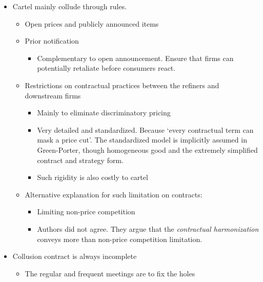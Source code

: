 \documentclass{book}
\theoremstyle{plain}
\theoremstyle{definition}
\begin{document}
\begin{itemize}
	\item Cartel mainly collude through rules.
	\begin{itemize}
		\item Open prices and publicly announced items
		\item Prior notification
		\begin{itemize}
			\item Complementary to open announcement. Ensure that firms can potentially retaliate before consumers react.
		\end{itemize}
		\item Restrictions on contractual practices between the refiners and downstream firms
		\begin{itemize}
			\item Mainly to eliminate discriminatory pricing
			\item Very detailed and standardized. Because `every contractual term can mask a price cut'. The standardized model is implicitly assumed in Green-Porter, though homogeneous good and the extremely simplified contract and strategy form.
			\item Such rigidity is also costly to cartel
		\end{itemize}
		\item Alternative explanation for such limitation on contracts:
		\begin{itemize}
			\item Limiting non-price competition
			\item Authors did not agree. They argue that the \textit{contractual harmonization} conveys more than non-price competition limitation.
		\end{itemize}
	\end{itemize}
	\item Collusion contract is always incomplete
	\begin{itemize}
		\item The regular and frequent meetings are to fix the holes
	\end{itemize}
	

\end{itemize}
\end{document}
